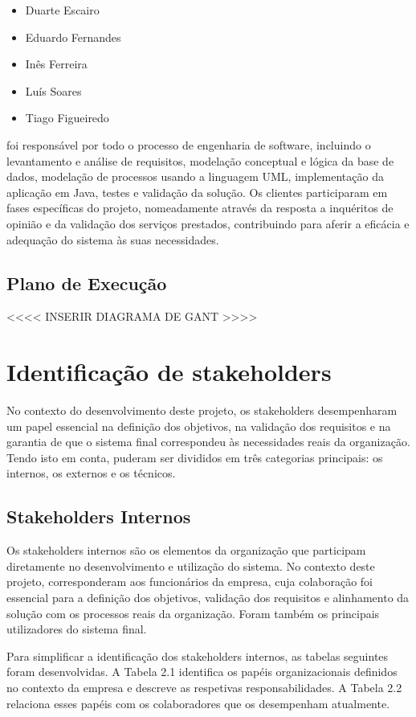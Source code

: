 \documentclass[a4paper,12pt]{scrreprt}
\begin{document}
\begin{itemize}
	\item Duarte Escairo
	\item Eduardo Fernandes
	\item Inês Ferreira
	\item Luís Soares
	\item Tiago Figueiredo
\end{itemize}

 foi responsável por todo o processo de engenharia de software, incluindo o levantamento e análise de requisitos, modelação conceptual e lógica da base de dados, modelação de processos usando a linguagem UML, implementação da aplicação em Java, testes e validação da solução. Os clientes participaram em fases específicas do projeto, nomeadamente através da resposta a inquéritos de opinião e da validação dos serviços prestados, contribuindo para aferir a eficácia e adequação do sistema às suas necessidades.

\subsection{Plano de Execução}

<<<< INSERIR DIAGRAMA DE GANT >>>>


\section{Identificação de stakeholders}
No contexto do desenvolvimento deste projeto, os stakeholders desempenharam um papel essencial na definição dos objetivos, na validação dos requisitos e na garantia de que o sistema final correspondeu às necessidades reais da organização. Tendo isto em conta, puderam ser divididos em três categorias principais: os internos, os externos e os técnicos.

\subsection{Stakeholders Internos}
Os stakeholders internos são os elementos da organização que participam diretamente no desenvolvimento e utilização do sistema. No contexto deste projeto, corresponderam aos funcionários da empresa, cuja colaboração foi essencial para a definição dos objetivos, validação dos requisitos e alinhamento da solução com os processos reais da organização. Foram também os principais utilizadores do sistema final. 

Para simplificar a identificação dos stakeholders internos, as tabelas seguintes foram desenvolvidas. A Tabela 2.1 identifica os papéis organizacionais definidos no contexto da empresa e descreve as respetivas responsabilidades. A Tabela 2.2 relaciona esses papéis com os colaboradores que os desempenham atualmente.
\end{document}
